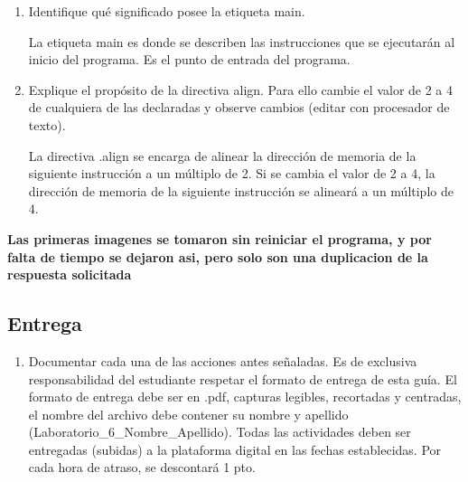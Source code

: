 \documentclass{templateNote}
\begin{document}
\begin{enumerate}[label=\alph*)]
    \item Identifique qué significado posee la etiqueta main.

    La etiqueta main es donde se describen las instrucciones que se ejecutarán al inicio del programa. Es el punto de entrada del programa.

    \item Explique el propósito de la directiva align. Para ello cambie el valor de 2 a 4 de cualquiera de las declaradas y observe cambios (editar con procesador de texto).     

    La directiva .align se encarga de alinear la dirección de memoria de la siguiente instrucción a un múltiplo de 2. Si se cambia el valor de 2 a 4, la dirección de memoria de la siguiente instrucción se alineará a un múltiplo de 4.
\end{enumerate}

\newpage
\begin{tcolorbox}
    \textbf{Las primeras imagenes se tomaron sin reiniciar el programa, y por falta de tiempo se dejaron asi, pero solo son una duplicacion de la respuesta solicitada}
\end{tcolorbox}

\subsection{Entrega}
\begin{enumerate}[label=\alph*]
    \item Documentar cada una de las acciones antes señaladas. Es de exclusiva responsabilidad del estudiante respetar el formato de entrega de esta guía. El formato de entrega debe ser en .pdf, capturas legibles, recortadas y centradas, el nombre del archivo debe contener su nombre y apellido (Laboratorio\_6\_Nombre\_Apellido). Todas las actividades deben ser entregadas (subidas) a la plataforma digital en las fechas establecidas. Por cada hora de atraso, se descontará 1 pto.
\end{enumerate}
\end{document}
